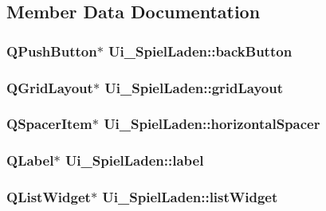 \subsection{Member Data Documentation}
\hypertarget{classUi__SpielLaden_a1037033e2de6d16b84dbd67f5a004f6b}{
\subsubsection[{back\-Button}]{\setlength{\rightskip}{0pt plus 5cm}Q\-Push\-Button$\ast$ Ui\-\_\-\-Spiel\-Laden\-::back\-Button}}\label{classUi__SpielLaden_a1037033e2de6d16b84dbd67f5a004f6b}
\hypertarget{classUi__SpielLaden_ad098c5fa7cc53100fb8a7b36b2652e42}{
\subsubsection[{grid\-Layout}]{\setlength{\rightskip}{0pt plus 5cm}Q\-Grid\-Layout$\ast$ Ui\-\_\-\-Spiel\-Laden\-::grid\-Layout}}\label{classUi__SpielLaden_ad098c5fa7cc53100fb8a7b36b2652e42}
\hypertarget{classUi__SpielLaden_a2ede480b208ea6777ea78d4951f96de6}{
\subsubsection[{horizontal\-Spacer}]{\setlength{\rightskip}{0pt plus 5cm}Q\-Spacer\-Item$\ast$ Ui\-\_\-\-Spiel\-Laden\-::horizontal\-Spacer}}\label{classUi__SpielLaden_a2ede480b208ea6777ea78d4951f96de6}
\hypertarget{classUi__SpielLaden_a21871b9f6c93c357a57aea0d2c2bac9b}{
\subsubsection[{label}]{\setlength{\rightskip}{0pt plus 5cm}Q\-Label$\ast$ Ui\-\_\-\-Spiel\-Laden\-::label}}\label{classUi__SpielLaden_a21871b9f6c93c357a57aea0d2c2bac9b}
\hypertarget{classUi__SpielLaden_a54a93deade0f70fd402035593aa2dd76}{
\subsubsection[{list\-Widget}]{\setlength{\rightskip}{0pt plus 5cm}Q\-List\-Widget$\ast$ Ui\-\_\-\-Spiel\-Laden\-::list\-Widget}}\label{classUi__SpielLaden_a54a93deade0f70fd402035593aa2dd76}
